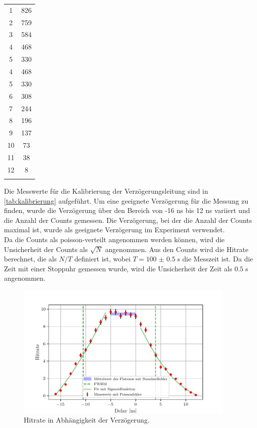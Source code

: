 \begin{table}[htbp]
\begin{minipage}[t]{0.45\linewidth}
\begin{tabular}{c|c}
      1 & 826\\
      2 & 759\\
      3 & 584\\
      4 & 468\\
      5 & 330\\
      4 & 468\\
      5 & 330\\
      6 & 308\\
      7 & 244\\
      8 & 196\\
      9 & 137\\
      10 & 73\\
      11 & 38\\
      12 & 8\\
         &  \\
      \hline
    \end{tabular}
  \end{minipage}
\end{table}

Die Messwerte für die Kalibrierung der Verzögerungsleitung sind in \autoref{tab:kalibrierung} aufgeführt. Um eine geeignete Verzögerung für die Messung zu finden, wurde die 
Verzögerung über den Bereich von -16 ns bis 12 ns variiert und die Anzahl der Counts gemessen. Die Verzögerung, bei der die Anzahl der Counts maximal ist, wurde als geeignete Verzögerung im Experiment verwendet.\\
Da die Counts als poisson-verteilt angenommen werden können, wird die Unsicherheit der Counts als $\sqrt{N}$ angenommen. Aus den Counts wird die Hitrate berechnet, die als $N/T$ definiert ist, wobei $T = \SI{100(0.5)}{s}$ die Messzeit ist. Da
die Zeit mit einer Stoppuhr gemessen wurde, wird die Unsicherheit der Zeit als $\SI{0.5}{s}$ angenommen.

\begin{figure}[H]
  \centering
  \includegraphics[width=0.95\textwidth]{build/delay.pdf}
  \caption{Hitrate in Abhängigkeit der Verzögerung.}
  \label{fig:kalibrierung}
\end{figure}

